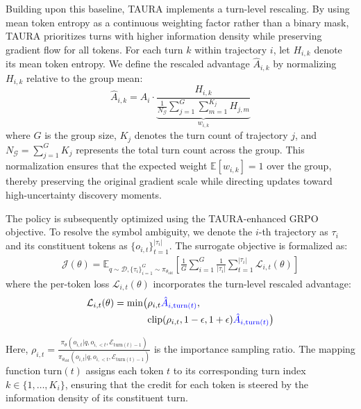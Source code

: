 \documentclass{article}
\theoremstyle{plain}
\theoremstyle{definition}
\theoremstyle{remark}
\begin{document}
Building upon this baseline, TAURA implements a turn-level rescaling. By using mean token entropy as a continuous weighting factor rather than a binary mask, TAURA prioritizes turns with higher information density while preserving gradient flow for all tokens. For each turn $k$ within trajectory $i$, let $H_{i,k}$ denote its mean token entropy. We define the rescaled advantage $\hat{A}_{i,k}$ by normalizing $H_{i,k}$ relative to the group mean:
\begin{equation}
\hat{A}_{i,k} = A_i \cdot \underbrace{\frac{H_{i,k}}{\frac{1}{N_{\mathcal{G}}} \sum_{j=1}^{G} \sum_{m=1}^{K_j} H_{j,m}}}_{w_{i,k}}
\end{equation}
where $G$ is the group size, $K_j$ denotes the turn count of trajectory $j$, and $N_{\mathcal{G}} = \sum_{j=1}^{G} K_j$ represents the total turn count across the group. This normalization ensures that the expected weight $\mathbb{E}[w_{i,k}] = 1$ over the group, thereby preserving the original gradient scale while directing updates toward high-uncertainty discovery moments.

The policy is subsequently optimized using the TAURA-enhanced GRPO objective. To resolve the symbol ambiguity, we denote the $i$-th trajectory as $\tau_i$ and its constituent tokens as $\{o_{i,t}\}_{t=1}^{|\tau_i|}$. The surrogate objective is formalized as:
\begin{equation}
\begin{aligned}
    \mathcal{J}(\theta) = \mathbb{E}_{q \sim \mathcal{D}, \{\tau_i\}_{i=1}^G \sim \pi_{\theta_{\text{old}}}} \left[ \frac{1}{G} \sum_{i=1}^G \frac{1}{|\tau_i|}\sum_{t=1}^{|\tau_i|} \mathcal{L}_{i,t}(\theta) \right]
\end{aligned}
\end{equation}
where the per-token loss $\mathcal{L}_{i,t}(\theta)$ incorporates the turn-level rescaled advantage:
\begin{equation}
\begin{aligned}
    \mathcal{L}_{i,t}(\theta) = \min \bigl( & \rho_{i,t} \textcolor{blue}{\hat{A}_{i, \mathrm{turn}(t)}}, \\
    & \text{clip}(\rho_{i,t}, 1-\epsilon, 1+\epsilon) \textcolor{blue}{\hat{A}_{i, \mathrm{turn}(t)}} \bigr)
\end{aligned}
\end{equation}

Here, $\rho_{i,t} = \frac{\pi_\theta(o_{i,t}|q, o_{i,<t}, \mathcal{E}_{\mathrm{turn}(t)-1})}{\pi_{\theta_{\text{old}}}(o_{i,t}|q, o_{i,<t}, \mathcal{E}_{\mathrm{turn}(t)-1})}$ is the importance sampling ratio. The mapping function $\mathrm{turn}(t)$ assigns each token $t$ to its corresponding turn index $k \in \{1, \dots, K_i\}$, ensuring that the credit for each token is steered by the information density of its constituent turn.
\end{document}
